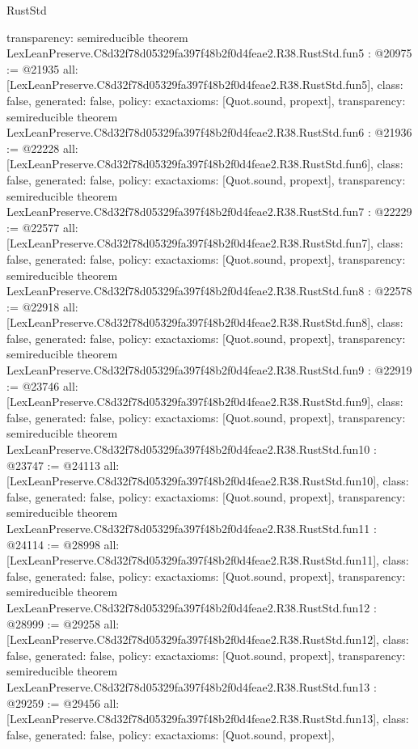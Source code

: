 \begin{lexlean}{RustStd}
\begin{coremodule}
{  transparency: semireducible
}
theorem LexLeanPreserve.C8d32f78d05329fa397f48b2f0d4feae2.R38.RustStd.fun5 : @20975 := @21935 {
  all: [LexLeanPreserve.C8d32f78d05329fa397f48b2f0d4feae2.R38.RustStd.fun5],
  class: false,
  generated: false,
  policy: exact{axioms: [Quot.sound, propext]},
  transparency: semireducible
}
theorem LexLeanPreserve.C8d32f78d05329fa397f48b2f0d4feae2.R38.RustStd.fun6 : @21936 := @22228 {
  all: [LexLeanPreserve.C8d32f78d05329fa397f48b2f0d4feae2.R38.RustStd.fun6],
  class: false,
  generated: false,
  policy: exact{axioms: [Quot.sound, propext]},
  transparency: semireducible
}
theorem LexLeanPreserve.C8d32f78d05329fa397f48b2f0d4feae2.R38.RustStd.fun7 : @22229 := @22577 {
  all: [LexLeanPreserve.C8d32f78d05329fa397f48b2f0d4feae2.R38.RustStd.fun7],
  class: false,
  generated: false,
  policy: exact{axioms: [Quot.sound, propext]},
  transparency: semireducible
}
theorem LexLeanPreserve.C8d32f78d05329fa397f48b2f0d4feae2.R38.RustStd.fun8 : @22578 := @22918 {
  all: [LexLeanPreserve.C8d32f78d05329fa397f48b2f0d4feae2.R38.RustStd.fun8],
  class: false,
  generated: false,
  policy: exact{axioms: [Quot.sound, propext]},
  transparency: semireducible
}
theorem LexLeanPreserve.C8d32f78d05329fa397f48b2f0d4feae2.R38.RustStd.fun9 : @22919 := @23746 {
  all: [LexLeanPreserve.C8d32f78d05329fa397f48b2f0d4feae2.R38.RustStd.fun9],
  class: false,
  generated: false,
  policy: exact{axioms: [Quot.sound, propext]},
  transparency: semireducible
}
theorem LexLeanPreserve.C8d32f78d05329fa397f48b2f0d4feae2.R38.RustStd.fun10 : @23747 := @24113 {
  all: [LexLeanPreserve.C8d32f78d05329fa397f48b2f0d4feae2.R38.RustStd.fun10],
  class: false,
  generated: false,
  policy: exact{axioms: [Quot.sound, propext]},
  transparency: semireducible
}
theorem LexLeanPreserve.C8d32f78d05329fa397f48b2f0d4feae2.R38.RustStd.fun11 : @24114 := @28998 {
  all: [LexLeanPreserve.C8d32f78d05329fa397f48b2f0d4feae2.R38.RustStd.fun11],
  class: false,
  generated: false,
  policy: exact{axioms: [Quot.sound, propext]},
  transparency: semireducible
}
theorem LexLeanPreserve.C8d32f78d05329fa397f48b2f0d4feae2.R38.RustStd.fun12 : @28999 := @29258 {
  all: [LexLeanPreserve.C8d32f78d05329fa397f48b2f0d4feae2.R38.RustStd.fun12],
  class: false,
  generated: false,
  policy: exact{axioms: [Quot.sound, propext]},
  transparency: semireducible
}
theorem LexLeanPreserve.C8d32f78d05329fa397f48b2f0d4feae2.R38.RustStd.fun13 : @29259 := @29456 {
  all: [LexLeanPreserve.C8d32f78d05329fa397f48b2f0d4feae2.R38.RustStd.fun13],
  class: false,
  generated: false,
  policy: exact{axioms: [Quot.sound, propext]},
}
\end{coremodule}
\end{lexlean}
